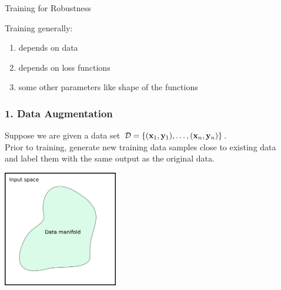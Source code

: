 \documentclass[aspectratio=169]{beamer}
\begin{document}
\begin{frame}
  \frametitle{}



  \begin{block}{ Training for Robustness}

    \end{block}

    \pause
    Training generally:

    \begin{enumerate}
    \item depends on data
    \item depends on loss functions
      \item some other parameters like shape of the functions
      \end{enumerate}

\end{frame}





\begin{frame}[fragile]
  \frametitle{1. Data Augmentation}
  Suppose we are given a data set $\mathcal{D} =  \{(\mathbf{x}_1, \mathbf{y}_1), \ldots , (\mathbf{x}_n, \mathbf{y}_n)\}$. \\
  Prior to training, generate new training data samples close to existing data\\ and label them with the same output as the original data.
      {\scriptsize
 \begin{thebibliography}{99}
   \beamertemplatearticlebibitems
\end{thebibliography}}

\pause

\begin{center}

  \includegraphics[width=5cm]{Images/SR-vs-CR-1.png}

  \end{center}

\end{frame}
\end{document}
